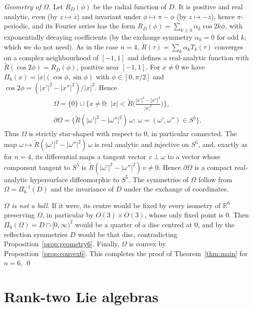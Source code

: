 \documentclass[11pt]{amsart}
\theoremstyle{definition}
\theoremstyle{remark}
\numberwithin{equation}{section}
\newcommand{\R}{\mathbb{R}}
\begin{document}
\emph{Geometry of $\Omega$.} Let $R_D(\phi)$ be the radial function of $D$. It is positive and real analytic, even (by $z\mapsto\overline z$) and invariant under $\phi\mapsto\pi-\phi$ (by $z\mapsto-\overline z$), hence $\pi$-periodic, and its Fourier series has the form $R_D(\phi)=\sum_{k\geq0}\alpha_k\cos2k\phi$, with exponentially decaying coefficients (by the exchange symmetry $\alpha_k=0$ for odd $k$, which we do not need). As in the case $n=4$, $\widetilde R(\tau)=\sum_k\alpha_kT_k(\tau)$ converges on a complex neighbourhood of $[-1,1]$ and defines a real-analytic function with $\widetilde R(\cos2\phi)=R_D(\phi)$, positive near $[-1,1]$. For $x\neq0$ we have $\Pi_6(x)=|x|(\cos\phi,\sin\phi)$ with $\phi\in[0,\pi/2]$ and $\cos2\phi=(|x'|^2-|x''|^2)/|x|^2$. Hence
\begin{gather*}
\Omega=\{0\}\cup\Big\{x\neq0:\ |x|<\widetilde R\Big(\frac{|x'|^2-|x''|^2}{|x|^2}\Big)\Big\},\\
\partial\Omega=\big\{\widetilde R(|\omega'|^2-|\omega''|^2)\,\omega:\ \omega=(\omega',\omega'')\in S^5\big\}.
\end{gather*}
Thus $\Omega$ is strictly star-shaped with respect to $0$, in particular connected. The map $\omega\mapsto\widetilde R(|\omega'|^2-|\omega''|^2)\,\omega$ is real analytic and injective on $S^5$, and, exactly as for $n=4$, its differential maps a tangent vector $v\perp\omega$ to a vector whose component tangent to $S^5$ is $\widetilde R(|\omega'|^2-|\omega''|^2)\,v\neq0$. Hence $\partial\Omega$ is a compact real-analytic hypersurface diffeomorphic to $S^5$. The symmetries of $\Omega$ follow from $\Omega=\Pi_6^{-1}(D)$ and the invariance of $D$ under the exchange of coordinates.

\emph{$\Omega$ is not a ball.} If it were, its centre would be fixed by every isometry of $\R^6$ preserving $\Omega$, in particular by $O(3)\times O(3)$, whose only fixed point is $0$. Then $\Pi_6(\Omega)=D\cap[0,\infty)^2$ would be a quarter of a disc centred at $0$, and by the reflection symmetries $D$ would be that disc, contradicting Proposition~\ref{prop:geometry6}. Finally, $\Omega$ is convex by Proposition~\ref{prop:convex6}. This completes the proof of Theorem~\ref{thm:main} for $n=6$. \qed

\section{Rank-two Lie algebras}\label{lie:sec}
\end{document}
